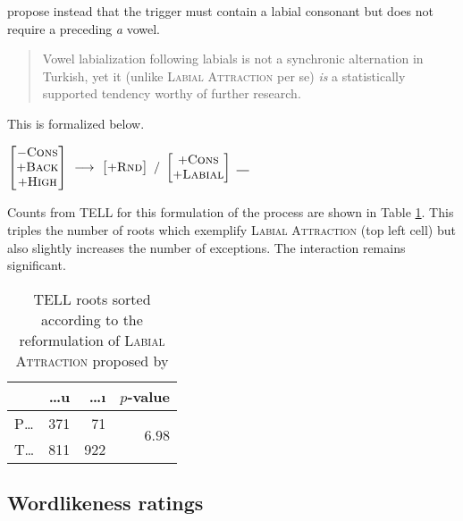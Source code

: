 \noindent
\citet{Inkelas2001} propose instead that the trigger must contain a labial consonant but does not require a preceding \emph{a} vowel.

\begin{quote}
Vowel labialization following labials is not a synchronic alternation in Turkish, yet it (unlike \textsc{Labial Attraction} per se) \emph{is} a statistically supported tendency worthy of further research. \citep[196]{Inkelas2001}
\end{quote}

\noindent
This is formalized below.

\begin{example}
$\begin{bmatrix} -\textsc{Cons} \\ +\textsc{Back} \\ +\textsc{High} \end{bmatrix}~\goesto~\begin{bmatrix} +\textsc{Rnd} \end{bmatrix}~/~\begin{bmatrix} +\textsc{Cons} \\ +\textsc{Labial} \end{bmatrix}~\gap{}$
\end{example}

Counts from TELL for this formulation of the process are shown in Table \ref{lasi}. This triples the number of roots which exemplify \textsc{Labial Attraction} (top left cell) but also slightly increases the number of exceptions. The interaction remains significant.

\begin{table}[ht]
\centering
\begin{tabular}{lrrr}
\toprule
       & \ldots{}u  & \ldots{}ı & $p$-value                      \\
\midrule
P\ldots{}  & 371    & 71        & \multirow{2}{*}{$6.98$\e{-49}} \\
T\ldots{}  & 811    & 922       &                                \\
\bottomrule
\end{tabular}
\caption{TELL roots sorted according to the reformulation of \textsc{Labial Attraction} proposed by \citet{Inkelas2001}}
\label{lasi}
\end{table}

\subsection{Wordlikeness ratings}

